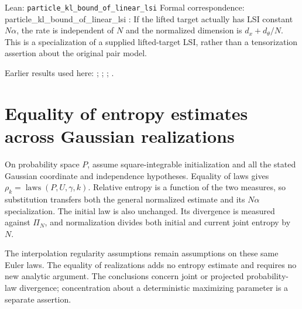 \documentclass[11pt,a4paper]{article}
\begin{document}
\begin{leanbox}{Lean: \texttt{particle\_\allowbreak{}kl\_\allowbreak{}bound\_\allowbreak{}of\_\allowbreak{}linear\_\allowbreak{}lsi}}
Formal correspondence: particle\_kl\_bound\_of\_linear\_lsi : If the lifted target actually has LSI constant \(N\alpha\), the rate is independent of \(N\) and the normalized dimension is \(d_x+d_\theta/N\). This is a specialization of a supplied lifted-target LSI, rather than a tensorization assertion about the original pair model.
\end{leanbox}


Earlier results used here: \cite[Section~3.1.3]{LangevinLean2026ULALSI}; \cite[Section~3.34.1]{LangevinLean2026ULALSI}; \cite[Section~3.1.1]{LangevinLean2026IPLA}; \cite[Section~3.3.2]{LangevinLean2026IPLA}.

\section{\texorpdfstring{Equality of entropy estimates across Gaussian realizations}{Equality of entropy estimates across Gaussian realizations}}


On probability space \(P\), assume square-integrable initialization and all the stated Gaussian coordinate and independence hypotheses. Equality of laws gives \(\rho_k=\operatorname{laws}(P,U,\gamma,k)\). Relative entropy is a function of the two measures, so substitution transfers both the general normalized estimate and its \(N\alpha\) specialization. The initial law is also unchanged. Its divergence is measured against \(\Pi_N\), and normalization divides both initial and current joint entropy by \(N\).



The interpolation regularity assumptions remain assumptions on these same Euler laws. The equality of realizations adds no entropy estimate and requires no new analytic argument. The conclusions concern joint or projected probability-law divergence; concentration about a deterministic maximizing parameter is a separate assertion.
\end{document}
